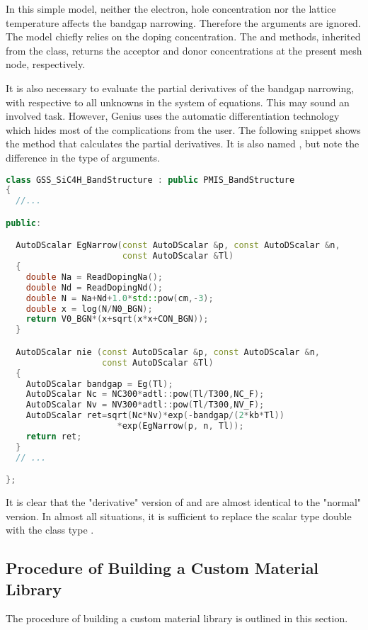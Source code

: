 \documentclass[oneside,12pt]{cgd_book}
\begin{document}
In this simple model, neither the electron, hole concentration nor the lattice temperature affects the
          bandgap narrowing. Therefore the arguments are ignored. The model chiefly relies on the doping concentration.
          The  and 
methods, inherited from
          the  class, returns the acceptor and donor concentrations at the present
          mesh node, respectively.
\par
It is also necessary to evaluate the partial derivatives of the bandgap narrowing, with respective to
          all unknowns in the system of equations. This may sound an involved task. However, Genius uses the automatic
          differentiation technology which hides most of the complications from the user. The following snippet shows
          the method that calculates the partial derivatives. It is also named
, but
          note the difference in the type of arguments.
\par
\begin{lstlisting}[language={C++}]
class GSS_SiC4H_BandStructure : public PMIS_BandStructure
{
  //...

public:

  AutoDScalar EgNarrow(const AutoDScalar &p, const AutoDScalar &n,
                       const AutoDScalar &Tl)
  {
    double Na = ReadDopingNa();
    double Nd = ReadDopingNd();
    double N = Na+Nd+1.0*std::pow(cm,-3);
    double x = log(N/N0_BGN);
    return V0_BGN*(x+sqrt(x*x+CON_BGN));
  }

  AutoDScalar nie (const AutoDScalar &p, const AutoDScalar &n,
                   const AutoDScalar &Tl)
  {
    AutoDScalar bandgap = Eg(Tl);
    AutoDScalar Nc = NC300*adtl::pow(Tl/T300,NC_F);
    AutoDScalar Nv = NV300*adtl::pow(Tl/T300,NV_F);
    AutoDScalar ret=sqrt(Nc*Nv)*exp(-bandgap/(2*kb*Tl))
                      *exp(EgNarrow(p, n, Tl));
    return ret;
  }
  // ...

};
\end{lstlisting}
It is clear that the "derivative" version of 
and  are almost identical to the "normal" version. In almost all situations, it is
          sufficient to replace the scalar type double with the class type
.
\par
\subsection{Procedure of Building a Custom Material Library}
The procedure of building a custom material library is outlined in this section.
\par
\end{document}
